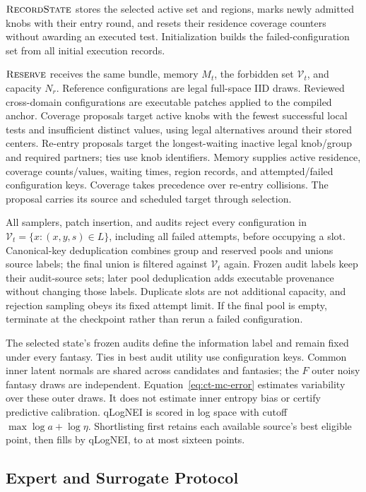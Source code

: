 $\textsc{RecordState}$ stores the selected active set and regions, marks
newly admitted knobs with their entry round, and resets their residence
coverage counters without awarding an executed test. Initialization builds
the failed-configuration set from all initial execution records.

$\textsc{Reserve}$ receives the same bundle, memory $M_t$, the forbidden
set $\mathcal V_t$, and capacity $N_r$. Reference configurations are legal
full-space IID draws. Reviewed cross-domain configurations are executable
patches applied to the compiled anchor. Coverage proposals target active
knobs with the fewest successful local tests and insufficient distinct
values, using legal alternatives around their stored centers. Re-entry
proposals target the longest-waiting inactive legal knob/group and required
partners; ties use knob identifiers. Memory supplies active residence,
coverage counts/values, waiting times, region records, and attempted/failed
configuration keys. Coverage takes precedence over re-entry collisions.
The proposal carries its source and scheduled target through selection.

All samplers, patch insertion, and audits reject every configuration in
$\mathcal V_t=\{x:(x,y,s)\in L\}$, including all failed attempts, before
occupying a slot. Canonical-key deduplication combines group and reserved
pools and unions source labels; the final union is filtered against
$\mathcal V_t$ again. Frozen audit labels keep their audit-source sets; later pool deduplication
adds executable provenance without changing those labels. Duplicate slots
are not additional capacity, and rejection sampling obeys its fixed attempt limit. If the final pool is
empty, terminate at the checkpoint rather than rerun a failed configuration.

The selected state's frozen audits define the information label and
remain fixed under every fantasy. Ties in best audit utility use
configuration keys. Common inner latent normals are shared across
candidates and fantasies; the $F$ outer noisy fantasy draws are independent.
Equation~\ref{eq:ct-mc-error} estimates variability over these outer draws.
It does not estimate inner entropy bias or certify predictive calibration.
qLogNEI is scored in log space with cutoff $\max\log a+\log\eta$.
Shortlisting first retains each available source's best eligible point,
then fills by qLogNEI, to at most sixteen points.

\subsection{Expert and Surrogate Protocol}


